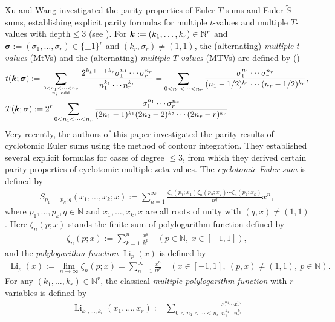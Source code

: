 \documentclass[11pt]{article}
\newcommand{\si}{\sigma}
\newcommand{\bfk}{{\boldsymbol{\sl{k}}}}
\newcommand\bfsi{{\boldsymbol \sigma}}
\DeclareMathOperator{\Li}{Li}
\def\N{\mathbb{N}}
\theoremstyle{plain}
\theoremstyle{definition}
\begin{document}
Xu and Wang investigated the parity properties of Euler $T$-sums and Euler $\tilde{S}$-sums, establishing explicit parity formulas for multiple $t$-values and multiple $T$-values with depth$\leq 3$ (see \cite[Thms. 40 and 52]{Xu-Wang2023}). For $\bfk:=(k_1,\ldots,k_r)\in \N^r$ and $\bfsi:=(\si_1,\ldots,\si_r)\in \{\pm 1\}^r$ and $(k_r,\si_r)\neq (1,1)$, the (alternating) \emph{multiple $t$-values} (MtVs) and  the (alternating) \emph{multiple $T$-values} (MTVs) are defined by (\cite{H2019,Xu-Wang2023})
\begin{align}
&t(\bfk;\bfsi):=\sum_{0<n_1<\cdots<n_r\atop n_i\ \text{odd}} \frac{2^{k_1+\cdots+k_r}\si_1^{n_1}\cdots \si_r^{n_r}}{n_1^{k_1}\cdots n_r^{k_r}}=\sum_{0<n_1<\cdots<n_r} \frac{\si_1^{n_1}\cdots \si_r^{n_r}}{(n_1-1/2)^{k_1}\cdots (n_r-1/2)^{k_r}},\\
&T(\bfk;\bfsi):=2^r\sum\limits_{0<n_1<\cdots<n_r} \frac{\si_1^{n_1}\cdots \si_r^{n_r}}{(2n_1-1)^{k_1} (2n_2-2)^{k_2}\cdots(2n_r-r)^{k_r}}.
\end{align}
Very recently, the authors of this paper \cite{Rui-Xu2025} investigated the parity results of cyclotomic Euler sums using the method of contour integration. They established several explicit formulas for cases of degree $\leq 3$, from which they derived certain parity properties of cyclotomic multiple zeta values. The \emph{cyclotomic Euler sum} is defined by
\begin{align}\label{defn-CyESs}
S_{p_1,\ldots, p_k;q}(x_1,\ldots,x_k;x):=\sum_{n=1}^\infty \frac{\zeta_{n}(p_1;x_1)\zeta_{n}(p_2;x_2)\cdots \zeta_{n}(p_k;x_k)}{n^q}x^n,
\end{align}
where $p_1,\ldots,p_k,q\in \N$ and $x_1,\ldots,x_k,x$ are all roots of unity with $(q,x)\neq (1,1)$. Here $\zeta_n(p;x)$ stands the finite sum of polylogarithm function defined by
\begin{align}
\zeta_n(p;x):=\sum_{k=1}^n \frac{x^k}{k^p}\quad (p\in \N,\ x\in [-1,1]),
\end{align}
and the \emph{polylogarithm function} $\Li_p(x)$ is defined by
\begin{align}
\Li_{p}(x):=\lim_{n\rightarrow \infty}\zeta_n(p;x)= \sum_{n=1}^\infty \frac{x^n}{n^p}\quad (x\in[-1,1],\ (p,x)\neq (1,1),\ p\in \N).
\end{align}
For any $(k_1,\dotsc,k_r)\in\N^r$, the classical \emph{multiple polylogarithm function} with $r$-variables is defined by
\begin{align}\label{defn-mpolyf}
\Li_{k_1,\dotsc,k_r}(x_1,\dotsc,x_r):=\sum_{0<n_1<\cdots<n_r} \frac{x_1^{n_1}\dotsm x_r^{n_r}}{n_1^{k_1}\dotsm n_r^{k_r}}
\end{align}
\end{document}
